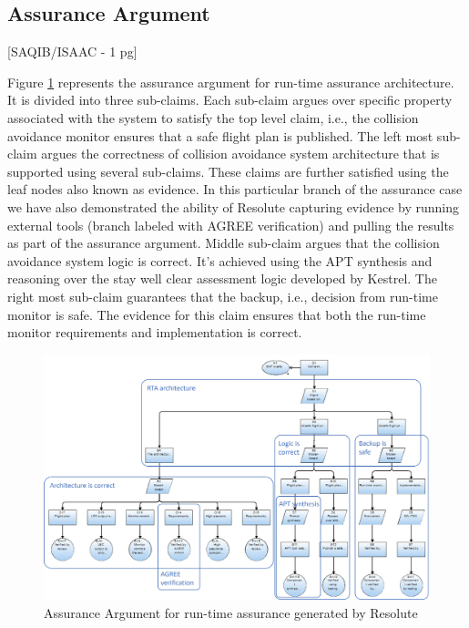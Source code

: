 \subsection{Assurance Argument}

[SAQIB/ISAAC - 1 pg]

Figure \ref{fig:rta-resolute} represents the assurance argument for run-time assurance architecture. It is divided into three sub-claims. Each sub-claim argues over specific property associated with the system to satisfy the top level claim, i.e., the collision avoidance monitor ensures that a safe flight plan is published. The left most sub-claim argues the correctness of  collision avoidance system architecture that is supported using several sub-claims. These claims are further satisfied using the leaf nodes also known as evidence. In this particular branch of the assurance case we have also demonstrated the ability of Resolute capturing evidence by running external tools (branch labeled with AGREE verification) and pulling the results as part of the assurance argument. Middle sub-claim argues that the collision avoidance system logic is correct. It's achieved using the APT synthesis and reasoning over the stay well clear assessment logic developed by Kestrel. The right most sub-claim guarantees that the backup, i.e., decision from run-time monitor is safe. The evidence for this claim ensures that both the run-time monitor requirements and implementation is correct. 


\begin{figure}
	\centering
	\includegraphics[width=\textwidth]{figures/rta-resolute.jpg}
	\caption{Assurance Argument for run-time assurance generated by Resolute}
	\label{fig:rta-resolute}
\end{figure}
